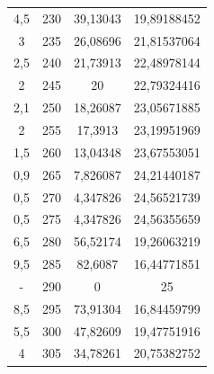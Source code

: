 \documentclass[12pt]{article}
\begin{document}
\begin{minipage}{.5\textwidth}
\begin{tabular}{c|c|c|c|}
        4,5 & 230 & 39,13043 & 19,89188452 \\ 
        3 & 235 & 26,08696 & 21,81537064 \\ 
        2,5 & 240 & 21,73913 & 22,48978144 \\ 
        2 & 245 & 20 & 22,79324416 \\ 
        2,1 & 250 & 18,26087 & 23,05671885 \\ 
        2 & 255 & 17,3913 & 23,19951969 \\ 
        1,5 & 260 & 13,04348 & 23,67553051 \\ 
        0,9 & 265 & 7,826087 & 24,21440187 \\ 
        0,5 & 270 & 4,347826 & 24,56521739 \\ 
        0,5 & 275 & 4,347826 & 24,56355659 \\ 
        6,5 & 280 & 56,52174 & 19,26063219 \\ 
        9,5 & 285 & 82,6087 & 16,44771851 \\ 
        - & 290 & 0 & 25 \\ 
        8,5 & 295 & 73,91304 & 16,84459799 \\ 
        5,5 & 300 & 47,82609 & 19,47751916 \\ 
        4 & 305 & 34,78261 & 20,75382752 \\ 
    \end{tabular}
\end{minipage}
\end{document}
